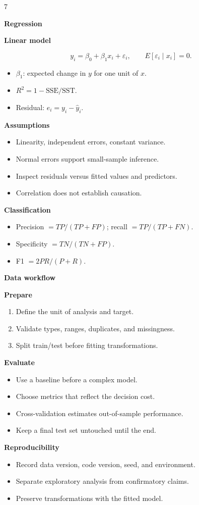 \documentclass[a4paper,landscape]{article}
\newcommand{\hlhighlight}[1]{\par\smallskip\noindent\colorbox{banner}{\strut\textbf{#1}}\par}
\newcommand{\sectitle}[1]{\par\smallskip\noindent\textcolor{section}{\textbf{#1}}\par}
\newcommand{\procname}[1]{\textcolor{process}{\textbf{#1}}}
\begin{document}
\begin{multicols}{7}
\hlhighlight{Regression}
\sectitle{Linear model}
\[
y_i=\beta_0+\beta_1x_i+\varepsilon_i,
\qquad E[\varepsilon_i\mid x_i]=0.
\]
\begin{itemize}
\item $\beta_1$: expected change in $y$ for one unit of $x$.
\item $R^2=1-\mathrm{SSE}/\mathrm{SST}$.
\item Residual: $e_i=y_i-\hat{y}_i$.
\end{itemize}
\sectitle{Assumptions}
\begin{itemize}
\item Linearity, independent errors, constant variance.
\item Normal errors support small-sample inference.
\item Inspect residuals versus fitted values and predictors.
\item Correlation does not establish causation.
\end{itemize}
\sectitle{Classification}
\begin{itemize}
\item Precision $=TP/(TP+FP)$; recall $=TP/(TP+FN)$.
\item Specificity $=TN/(TN+FP)$.
\item F1 $=2PR/(P+R)$.
\end{itemize}

\hlhighlight{Data workflow}
\sectitle{\procname{Prepare}}
\begin{enumerate}
\item Define the unit of analysis and target.
\item Validate types, ranges, duplicates, and missingness.
\item Split train/test before fitting transformations.
\end{enumerate}
\sectitle{\procname{Evaluate}}
\begin{itemize}
\item Use a baseline before a complex model.
\item Choose metrics that reflect the decision cost.
\item Cross-validation estimates out-of-sample performance.
\item Keep a final test set untouched until the end.
\end{itemize}
\sectitle{Reproducibility}
\begin{itemize}
\item Record data version, code version, seed, and environment.
\item Separate exploratory analysis from confirmatory claims.
\item Preserve transformations with the fitted model.
\end{itemize}


\end{multicols}
\end{document}
